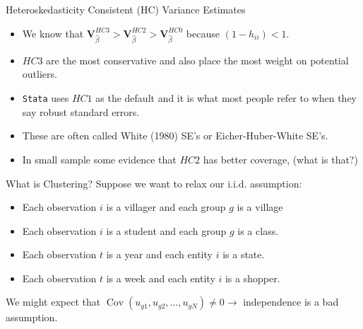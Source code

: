 \documentclass[aspectratio=169,11pt]{beamer}
\begin{document}
\begin{frame}{Heteroskedasticity Consistent (HC) Variance Estimates}
\begin{itemize}
\item We know that $\mathbf{V}_{\widehat{\beta}}^{HC3} > \mathbf{V}_{\widehat{\beta}}^{HC2} > \mathbf{V}_{\widehat{\beta}}^{HC0}$ because $(1- h_{ii}) <1$.
\item $HC3$ are the most \alert{conservative} and also place the most weight on potential outliers.
\item \texttt{Stata} uses $HC1$ as the default and it is what most people refer to when they say \alert{robust standard errors}.
\item These are often called White (1980) SE's or Eicher-Huber-White SE's.
\item In small sample some evidence that $HC2$ has better \alert{coverage}, (what is that?)
\end{itemize}
\end{frame}


\begin{frame}{What is Clustering?}
Suppose we want to relax our i.i.d. assumption:
\begin{itemize}
\item Each observation $i$ is a \alert{villager} and each group $g$ is a \alert{village}
\item Each observation $i$ is a \alert{student} and each group $g$ is a \alert{class}.
\item Each observation $t$ is a \alert{year} and each entity $i$ is a \alert{state}.
\item Each observation $t$ is a \alert{week} and each entity $i$ is a \alert{shopper}.
\end{itemize}
We might expect that $\operatorname { Cov } (u_{g1},u_{g2},\ldots,u_{gN}) \neq 0 \rightarrow$ independence is a bad assumption. 
\end{frame}
\end{document}
